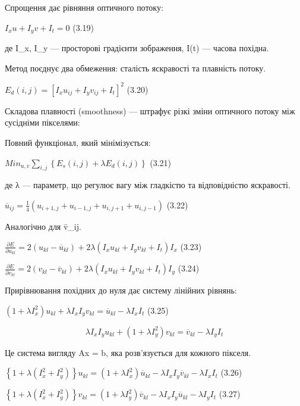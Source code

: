\documentclass[
]{article}
\begin{document}
Спрощення дає рівняння оптичного потоку:

\(I_{x}u + I_{y}v + I_{t} = 0\) (3.19)

де I\_x, I\_y --- просторові градієнти зображення, I(t) --- часова похідна.

Метод поєднує два обмеження: сталість яскравості та плавність потоку.

\(E_{d}(i,j) = \left\lbrack {I_{x}u_{ij} + I_{y}v_{ij} + I_{t}} \right\rbrack^{2}\) (3.20)

Складова плавності (smoothness) --- штрафує різкі зміни оптичного потоку між сусідніми пікселями:

Повний функціонал, який мінімізується:

\({Min}_{u,v}\sum_{i,j}^{}\left\{ {E_{s}(i,j) + \lambda E_{d}(i,j)} \right\}\) (3.21)

де λ --- параметр, що регулює вагу між гладкістю та відповідністю яскравості.

\({\overline{u}}_{ij} = \frac{1}{4}\left( {u_{i + 1,j} + u_{i - 1,j} + u_{i,j + 1} + u_{i,j - 1}} \right)\) (3.22)

Аналогічно для v̄\_ij.

\(\frac{\partial E}{\partial u_{kl}} = 2\left( u_{kl} - {\overline{u}}_{kl} \right) + 2\lambda\left( I_{x}u_{kl} + I_{y}v_{kl} + I_{t} \right)I_{x}\) (3.23)

\(\frac{\partial E}{\partial v_{kl}} = 2\left( v_{kl} - {\overline{v}}_{kl} \right) + 2\lambda\left( I_{x}u_{kl} + I_{y}v_{kl} + I_{t} \right)I_{y}\) (3.24)

Прирівнювання похідних до нуля дає систему лінійних рівнянь:

\(\left( 1 + \lambda I_{x}^{2} \right)u_{kl} + \lambda I_{x}I_{y}v_{kl} = {\overline{u}}_{kl} - \lambda I_{x}I_{t}\) (3.25)

\[\lambda I_{x}I_{y}u_{kl} + \left( 1 + \lambda I_{y}^{2} \right)v_{kl} = {\overline{v}}_{kl} - \lambda I_{y}I_{t}\]

Це система вигляду Ax = b, яка розв'язується для кожного пікселя.

\(\left\{ 1 + \lambda\left( I_{x}^{2} + I_{y}^{2} \right) \right\} u_{kl} = \left( 1 + \lambda I_{x}^{2} \right){\overline{u}}_{kl} - \lambda I_{x}I_{y}{\overline{v}}_{kl} - \lambda I_{x}I_{t}\) (3.26)

\(\left\{ 1 + \lambda\left( I_{x}^{2} + I_{y}^{2} \right) \right\} v_{kl} = \left( 1 + \lambda I_{y}^{2} \right){\overline{v}}_{kl} - \lambda I_{x}I_{y}{\overline{u}}_{kl} - \lambda I_{y}I_{t}\) (3.27)
\end{document}
